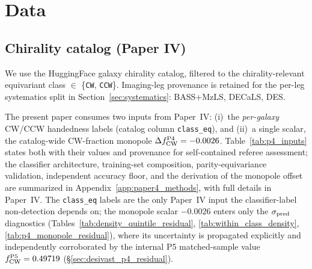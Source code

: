 \documentclass[aps,prd,twocolumn,superscriptaddress,showpacs,preprintnumbers,nofootinbib,longbibliography,floatfix]{revtex4-2}
\begin{document}
\section{Data}\label{sec:data}

\subsection{Chirality catalog (Paper IV)}

We use the HuggingFace galaxy chirality catalog,
filtered to the chirality-relevant equivariant class $\in$
\{\texttt{CW}, \texttt{CCW}\}. Imaging-leg provenance is retained for
the per-leg systematics split in Section~\ref{sec:systematics}:
BASS+MzLS, DECaLS, DES.

The present paper consumes two inputs from Paper~IV:
(i)~the \emph{per-galaxy} CW/CCW handedness labels (catalog column
\texttt{class\_eq}), and (ii)~a single scalar, the catalog-wide CW-fraction
monopole $\Delta f_{\rm CW}^{\rm P4} = -0.0026$. Table~\ref{tab:p4_inputs}
states both with their values and provenance for self-contained referee
assessment; the classifier architecture, training-set composition,
parity-equivariance validation, independent accuracy floor, and the
derivation of the monopole offset are summarized in
Appendix~\ref{app:paper4_methods}, with full details in Paper~IV. The
\texttt{class\_eq} labels are the only Paper~IV input the
classifier-label non-detection depends on; the monopole scalar
$-0.0026$ enters only the $\sigma_{\rm pred}$ diagnostics
(Tables~\ref{tab:density_quintile_residual},
\ref{tab:within_class_density}, \ref{tab:p4_monopole_residual}), where
its uncertainty is propagated explicitly and independently corroborated by
the internal P5 matched-sample value $f_{\rm CW}^{\rm P5} = 0.49719$
(\S\ref{sec:desivast_p4_residual}).
\end{document}
